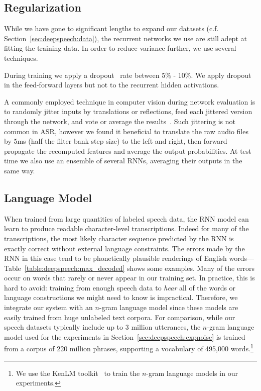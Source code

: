 \subsection{Regularization}

While we have gone to significant lengths to expand our datasets (c.f.
Section~\ref{sec:deepspeech:data}), the recurrent networks we use are still
adept at fitting the training data. In order to reduce variance further, we use
several techniques.  

During training we apply a dropout~\cite{hinton2012dropout} rate between 5\% -
10\%. We apply dropout in the feed-forward layers but not to the recurrent
hidden activations.

A commonly employed technique in computer vision during network evaluation is
to randomly jitter inputs by translations or reflections, feed each jittered
version through the network, and vote or average the
results~\cite{krizhevsky2012imagenet}. Such jittering is not common in ASR,
however we found it beneficial to translate the raw audio files by 5ms (half
the filter bank step size) to the left and right, then forward propagate the
recomputed features and average the output probabilities. At test time we also
use an ensemble of several RNNs, averaging their outputs in the same way.

\subsection{Language Model}
\label{sec:deepspeech:languagemodel}

When trained from large quantities of labeled speech data, the RNN model can
learn to produce readable character-level transcriptions. Indeed for many of
the transcriptions, the most likely character sequence predicted by the RNN is
exactly correct without external language constraints. The errors made by the
RNN in this case tend to be phonetically plausible renderings of English
words---Table~\ref{table:deepspeech:max_decoded} shows some examples. Many of
the errors occur on words that rarely or never appear in our training set. In
practice, this is hard to avoid:  training from enough speech data to
\emph{hear} all of the words or language constructions we might need to know is
impractical.  Therefore, we integrate our system with an $n$-gram language model
since these models are easily trained from huge unlabeled text corpora. For
comparison, while our speech datasets typically include up to 3 million
utterances, the $n$-gram language model used for the experiments in
Section~\ref{sec:deepspeech:expnoise} is trained from a corpus of 220 million
phrases, supporting a vocabulary of 495,000 words.\footnote{We use the KenLM
toolkit~\cite{heafield2013} to train the $n$-gram language models in our
experiments.} 


